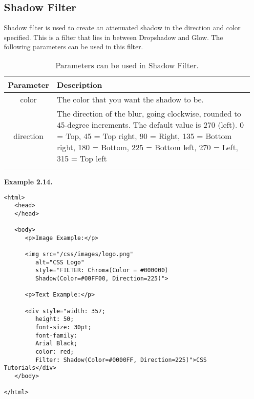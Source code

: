 \documentclass[a4paper,oneside]{book}
\numberwithin{equation}{chapter}
\begin{document}
\subsection{Shadow Filter}
Shadow filter is used to create an attenuated shadow in the direction and color specified. This is a filter that lies in between Dropshadow and Glow. The following parameters can be used in this filter.
\begin{center}
\begin{longtable}{|c|p{9cm}|}
\hline
\textbf{Parameter} & \textbf{Description}\\
\hline
color & The color that you want the shadow to be.\\
\hline
direction & The direction of the blur, going clockwise, rounded to 45-degree increments. The default value is 270 (left). 0 = Top, 45 = Top right, 90 = Right, 135 = Bottom right, 180 = Bottom, 225 = Bottom left, 270 = Left, 315 = Top left\\
\hline
\caption{Parameters can be used in Shadow Filter.}
\end{longtable}
\end{center}
\textbf{Example 2.14.}
\begin{verbatim}
<html>
   <head>
   </head>
   
   <body>
      <p>Image Example:</p>
      
      <img src="/css/images/logo.png" 
         alt="CSS Logo" 
         style="FILTER: Chroma(Color = #000000) 
         Shadow(Color=#00FF00, Direction=225)">
      
      <p>Text Example:</p>
      
      <div style="width: 357; 
         height: 50; 
         font-size: 30pt; 
         font-family: 
         Arial Black; 
         color: red; 
         Filter: Shadow(Color=#0000FF, Direction=225)">CSS Tutorials</div>
   </body>
   
</html> 
\end{verbatim}
\end{document}
